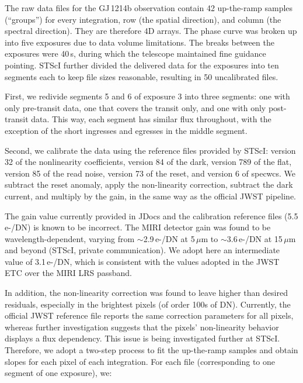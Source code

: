 \documentclass[pdflatex,sn-standardnature]{sn-jnl}%
\begin{document}
The raw data files for the GJ\,1214b observation contain 42 up-the-ramp samples (``groups'') for every integration, row (the spatial direction), and column (the spectral direction).  They are therefore 4D arrays.  The phase curve was broken up into five exposures due to data volume limitations. The breaks between the exposures were 40\,s, during which the telescope maintained fine guidance pointing. STScI further divided the delivered data for the exposures into ten segments each to keep file sizes reasonable, resulting in 50 uncalibrated files.

First, we redivide segments 5 and 6 of exposure 3 into three segments: one with only pre-transit data, one that covers the transit only, and one with only post-transit data.  This way, each segment has similar flux throughout, with the exception of the short ingresses and egresses in the middle segment.

Second, we calibrate the data using the reference files provided by STScI: version 32 of the nonlinearity coefficients, version 84 of the dark, version 789 of the flat, version 85 of the read noise, version 73 of the reset, and version 6 of specwcs.  We subtract the reset anomaly, apply the non-linearity correction, subtract the dark current, and multiply by the gain, in the same way as the official JWST pipeline. 

The gain value currently provided in JDocs and the calibration reference files (5.5 e-/DN) is known to be incorrect. The MIRI detector gain was found to be wavelength-dependent, varying from $\sim$2.9\,e-/DN at 5\,$\mu$m to $\sim$3.6\,e-/DN at 15\,$\mu$m and beyond (STScI, private communication). We adopt here an intermediate value of 3.1\,e-/DN, which is consistent with the values adopted in the JWST ETC over the MIRI LRS passband. 

In addition, the non-linearity correction was found to leave higher than desired residuals, especially in the brightest pixels (of order 100s of DN). Currently, the official JWST reference file reports the same correction parameters for all pixels, whereas further investigation suggests that the pixels' non-linearity behavior displays a flux dependency. This issue is being investigated further at STScI.  Therefore, we adopt a two-step process to fit the up-the-ramp samples and obtain slopes for each pixel of each integration.  For each file (corresponding to one segment of one exposure), we:
\end{document}
